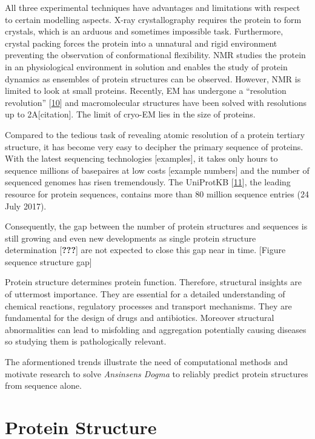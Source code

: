 \documentclass[12pt,a4paper,twoside]{book}
\theoremstyle{definition}
\theoremstyle{definition}
\theoremstyle{remark}
\begin{document}
All three experimental techniques have advantages and limitations with
respect to certain modelling aspects. X-ray crystallography requires the
protein to form crystals, which is an arduous and sometimes impossible
task. Furthermore, crystal packing forces the protein into a unnatural
and rigid environment preventing the observation of conformational
flexibility. NMR studies the protein in an physiological environment in
solution and enables the study of protein dynamics as ensembles of
protein structures can be observed. However, NMR is limited to look at
small proteins. Recently, EM has undergone a ``resolution revolution''
{[}\protect\hyperlink{ref-Egelman2016}{10}{]} and macromolecular
structures have been solved with resolutions up to 2A{[}citation{]}. The
limit of cryo-EM lies in the size of proteins.

Compared to the tedious task of revealing atomic resolution of a protein
tertiary structure, it has become very easy to decipher the primary
sequence of proteins. With the latest sequencing technologies
{[}examples{]}, it takes only hours to sequence millions of basepaires
at low costs {[}example numbers{]} and the number of sequenced genomes
has risen tremendously. The UniProtKB
{[}\protect\hyperlink{ref-TheUniProtConsortium2013}{11}{]}, the leading
resource for protein sequences, contains more than 80 million sequence
entries (24 July 2017).

Consequently, the gap between the number of protein structures and
sequences is still growing and even new developments as single protein
structure determination {[}{\textbf{???}}{]} are not expected to close
this gap near in time. {[}Figure sequence structure gap{]}

Protein structure determines protein function. Therefore, structural
insights are of uttermost importance. They are essential for a detailed
understanding of chemical reactions, regulatory processes and transport
mechanisms. They are fundamental for the design of drugs and
antibiotics. Moreover structural abnormalities can lead to misfolding
and aggregation potentially causing diseases so studying them is
pathologically relevant.

The aformentioned trends illustrate the need of computational methods
and motivate research to solve \emph{Ansinsens Dogma} to reliably
predict protein structures from sequence alone.

\section{Protein Structure}\label{protein-structure}
\end{document}
